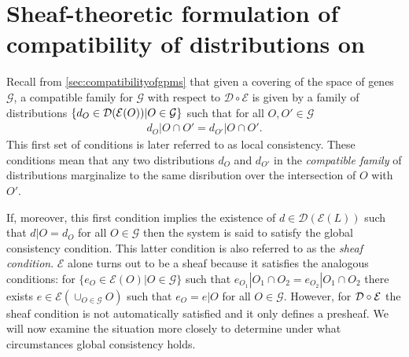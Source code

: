 \section{Sheaf-theoretic formulation of compatibility of distributions on \gnpm{}}\label{secsupp:compatibilityofgpms}
Recall from \ref{sec:compatibilityofgpms} that given a covering of the space of genes $\mathcal{G}$, a compatible family for $\mathcal{G}$ with respect to $\mathcal{D} \circ \mathcal{E}$ is given by a family of distributions $\{d_O \in \mathcal{D} (\mathcal{E}(O)) | O \in \mathcal{G}\}$ such that for all $O, O' \in \mathcal{G}$
\begin{eqnarray}\label{eq:sheafcond}
d_O|O \cap O' = d_{O'}|O \cap O'.
\end{eqnarray}
This first set of conditions is later referred to as local consistency. These conditions mean that any two distributions $d_O$ and $d_{O'}$ in the \emph{compatible family} of distributions marginalize to the same disribution over the intersection of $O$ with $O'$.

If, moreover, this first condition implies the existence of $d \in \mathcal{D}( \mathcal{E}(L))$ such that $d|O = d_O$ for all $O \in \mathcal{G}$ then the system is said to satisfy the global consistency condition.  This latter condition is also referred to as the \emph{sheaf condition}.  $\mathcal{E}$ alone turns out to be a sheaf because it satisfies the analogous conditions: for $\{e_O \in \mathcal{E}(O) | O \in \mathcal{G}\}$ such that $e_{O_{1}} | O_1 \cap O_2 = e_{O_{2}} | O_1 \cap O_2$ there exists $e \in \mathcal{E}(\cup_{O \in \mathcal{G}} O)$ such that $e_O = e|O$ for all $O \in \mathcal{G}$.  However, for $\mathcal{D} \circ \mathcal{E}$ the sheaf condition is not automatically satisfied and it only defines a presheaf.  We will now examine the situation more closely to determine under what circumstances global consistency holds.

